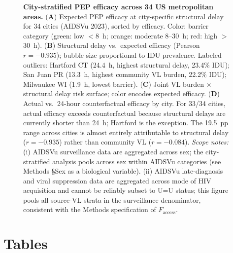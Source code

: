 \documentclass[10pt,letterpaper]{article}
\theoremstyle{definition}
\theoremstyle{remark}
\newcommand{\Faccess}{F_{\text{access}}}
\begin{document}
\begin{figure}[!ht]
\centering
\caption{\textbf{City-stratified PEP efficacy across 34 US metropolitan areas.}
(\textbf{A}) Expected PEP efficacy at city-specific structural delay for 34 cities (AIDSVu 2023), sorted by efficacy. Color: barrier category (green: low $<$8~h; orange: moderate 8--30~h; red: high $>$30~h).
(\textbf{B}) Structural delay vs.\ expected efficacy (Pearson $r = -0.935$); bubble size proportional to IDU prevalence. Labeled outliers: Hartford CT (24.4~h, highest structural delay, 23.4\% IDU); San Juan PR (13.3~h, highest community VL burden, 22.2\% IDU); Milwaukee WI (1.9~h, lowest barrier).
(\textbf{C}) Joint VL burden $\times$ structural delay risk surface; color encodes expected efficacy.
(\textbf{D}) Actual vs.\ 24-hour counterfactual efficacy by city. For 33/34 cities, actual efficacy exceeds counterfactual because structural delays are currently shorter than 24~h; Hartford is the exception. The 19.5~pp range across cities is almost entirely attributable to structural delay ($r = -0.935$) rather than community VL ($r = -0.084$). \textit{Scope notes:} (i) AIDSVu surveillance data are aggregated across sex; the city-stratified analysis pools across sex within AIDSVu categories (see Methods §Sex as a biological variable). (ii) AIDSVu late-diagnosis and viral suppression data are aggregated across mode of HIV acquisition and cannot be reliably subset to U=U status; this figure pools all source-VL strata in the surveillance denominator, consistent with the Methods specification of $\Faccess$.}
\label{fig:city}
\end{figure}

\clearpage
\section*{Tables}
\end{document}
